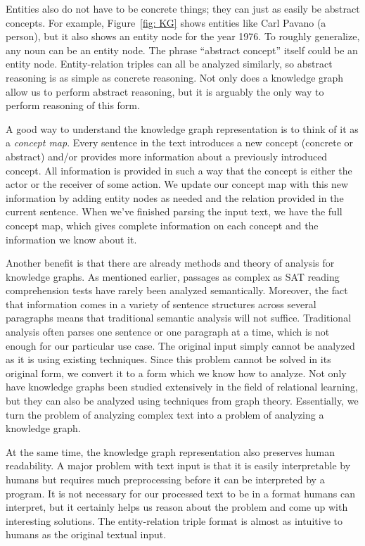\documentclass[pageno]{final_paper}
\begin{document}
Entities also do not have to be concrete things; they can just as easily be
abstract concepts. For example, Figure~\ref{fig: KG} shows entities like Carl
Pavano (a person), but it also shows an entity node for the year 1976. To
roughly generalize, any noun can be an entity node. The phrase ``abstract
concept'' itself could be an entity node. Entity-relation triples can all be
analyzed similarly, so abstract reasoning is as simple as concrete reasoning.
Not only does a knowledge graph allow us to perform abstract reasoning, but it
is arguably the only way to perform reasoning of this form.

A good way to understand the knowledge graph representation is to think of it as
a \textit{concept map}. Every sentence in the text introduces a new concept
(concrete or abstract) and/or provides more information about a previously
introduced concept. All information is provided in such a way that the concept
is either the actor or the receiver of some action. We update our concept map
with this new information by adding entity nodes as needed and the relation
provided in the current sentence. When we've finished parsing the input text,
we have the full concept map, which gives complete information on each concept
and the information we know about it.

Another benefit is that there are already methods and theory of analysis for
knowledge graphs. As mentioned earlier, passages as complex as SAT reading
comprehension tests have rarely been analyzed semantically. Moreover, the fact
that information comes in a variety of sentence structures across several
paragraphs means that traditional semantic analysis will not suffice.
Traditional analysis often parses one sentence or one paragraph at a time, which
is not enough for our particular use case. The original input simply cannot be
analyzed as it is using existing techniques. Since this problem cannot be solved
in its original form, we convert it to a form which we know how to analyze. Not
only have knowledge graphs been studied extensively in the field of relational
learning, but they can also be analyzed using techniques from graph theory.
Essentially, we turn the problem of analyzing complex text into a problem of
analyzing a knowledge graph.

At the same time, the knowledge graph representation also preserves human
readability. A major problem with text input is that it is easily interpretable
by humans but requires much preprocessing before it can be interpreted by a
program. It is not necessary for our processed text to be in a format humans can
interpret, but it certainly helps us reason about the problem and come up with
interesting solutions. The entity-relation triple format is almost as intuitive
to humans as the original textual input.
\end{document}
